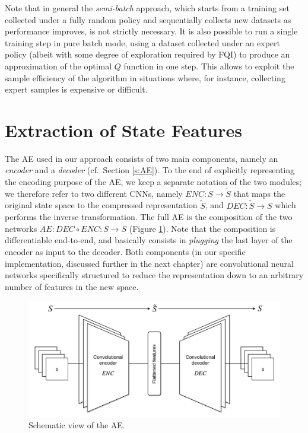 %
Note that in general the \textit{semi-batch} approach, which starts from a 
training set collected under a fully random policy and sequentially collects new
datasets as performance improves, is not strictly necessary. It is also possible
to run a single training step in pure batch mode, using a dataset collected 
under an expert policy (albeit with some degree of exploration required by FQI) 
to produce an approximation of the optimal $Q$ function in one step. 
This allows to exploit the sample efficiency of the algorithm in situations 
where, for instance, collecting expert samples is expensive or difficult.

\section{Extraction of State Features}
The AE used in our approach consists of two main components, namely an 
\textit{encoder} and a \textit{decoder} (cf.\ Section \ref{s:AE}). To the end of 
explicitly representing the encoding purpose of the AE, we keep a separate 
notation of the two modules; we therefore refer to two different CNNs, namely 
$ENC: S \rightarrow \tilde{S}$ that maps the original state space to the 
compressed representation $\tilde{S}$, and $DEC: \tilde{S} \rightarrow S$ 
which performs the inverse transformation. The full AE is the composition of the
two networks $AE: DEC \circ ENC: S \rightarrow S$ (Figure \ref{f:ae}). 
Note that the composition is differentiable end-to-end, and basically consists 
in \textit{plugging} the last layer of the encoder as input to the decoder. 
Both components (in our specific implementation, discussed further in the next
chapter) are convolutional neural networks specifically structured to reduce the
representation down to an arbitrary number of features in the new space.
%
\begin{figure}
\includegraphics[width=\textwidth]{pictures/conv_autoencoder}
\centering
\caption[Schematic view of the AE]{Schematic view of the AE.}
\label{f:ae}
\end{figure}
%

